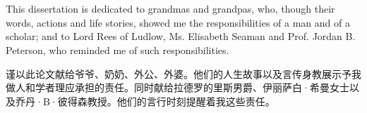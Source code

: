 ﻿\chapter*{}
This dissertation is dedicated to grandmas and grandpas, who, though their words, actions and life stories, showed me the responsibilities of a man and of a scholar; and to Lord Rees of Ludlow, Ms. Elisabeth Seaman and Prof. Jordan B. Peterson, who reminded me of such responsibilities.\\

\begin{CJK*}{UTF8}{gkai}
谨以此论文献给爷爷、奶奶、外公、外婆。他们的人生故事以及言传身教展示予我做人和学者理应承担的责任。同时献给拉德罗的里斯男爵、伊丽萨白·希曼女士以及乔丹·B·彼得森教授。他们的言行时刻提醒着我这些责任。
\end{CJK*}